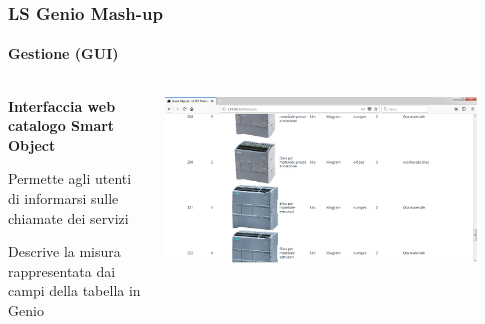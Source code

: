 \documentclass{beamer}
\begin{document}
\begin{frame}
\frametitle{LS Genio Mash-up}
\framesubtitle{Gestione (GUI)}
\begin{columns}[T] %
	\begin{column}{.3\textwidth}
		
		\begin{itemize}
			{\tiny
				\item \textbf{Interfaccia web catalogo Smart Object}
				
				\begin{itemize}
					{\tiny
						\item Permette agli utenti di informarsi sulle chiamate dei servizi
						\item Descrive la misura rappresentata dai campi della tabella in Genio
					}
				\end{itemize}
				
			}
		\end{itemize}
		
	\end{column}%
	\hfill%
	\begin{column}{.66\textwidth}
		\includegraphics[width=0.9\textwidth]{images/SmartObjectsPlatform.png}
	\end{column}%
\end{columns}
\end{frame}
\end{document}
